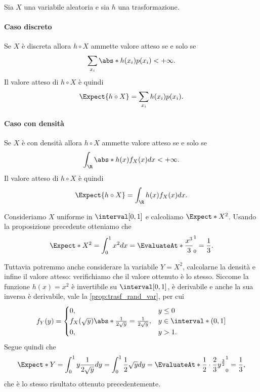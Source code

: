 \begin{proposition}
    Sia $X$ una variabile aleatoria e sia $h$ una trasformazione.
    \paragraph{Caso discreto} Se $X$ è discreta allora $h \circ X$ ammette valore atteso se e solo se \[
        \sum_{x_i} \abs*{h(x_i)}p(x_i) < +\infty.    
    \] Il valore atteso di $h \circ X$ è quindi \[
        \Expect{h \circ X} = \sum_{x_i} h(x_i)p(x_i).    
    \]
    \paragraph{Caso con densità} Se $X$ è con densità allora $h \circ X$ ammette valore atteso se e solo se \[
        \int_{\R} \abs*{h(x)}f_X(x)dx < +\infty.    
    \] Il valore atteso di $h \circ X$ è quindi \[
        \Expect{h \circ X} = \int_{\R} h(x)f_X(x)dx.
    \]
\end{proposition}

\begin{example}
    Consideriamo $X$ uniforme in $\interval[{0, 1}]$ e calcoliamo $\Expect*{X^2}$. Usando la proposizione precedente otteniamo che \[
        \Expect*{X^2} = \int_0^1 x^2dx = \EvaluateAt*{\frac{x^3}{3}}_0^1 = \frac13.
    \]

    Tuttavia potremmo anche considerare la variabile $Y = X^2$, calcolarne la densità e infine il valore atteso: verifichiamo che il valore ottenuto è lo stesso.
    Siccome la funzione $h(x) = x^2$ è invertibile su $\interval[{0, 1}]$, è derivabile e anche la sua inversa è derivabile, vale la \autoref{prop:trasf_rand_var}, per cui \[
        f_Y(y) = \begin{cases}
            0, &y \leq 0\\
            f_X(\sqrt{y}) \abs*{\frac{1}{2\sqrt{y}}} = \frac{1}{2\sqrt{y}}, &y \in \interval*({0, 1}]\\
            0, &y > 1.
        \end{cases}
    \] Segue quindi che \[
        \Expect*{Y} = \int_0^1 y\frac{1}{2\sqrt y}dy = \int_0^1 \frac12\sqrt{y}dy = \EvaluateAt*{\frac12 \cdot \frac23 y^{\frac32}}_0^1 = \frac13,
    \] che è lo stesso risultato ottenuto precedentemente.
\end{example}

